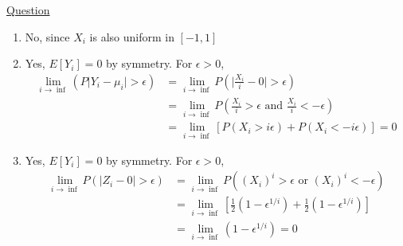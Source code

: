 \documentclass[11pt, a4paper]{article}
\begin{document}
\begin{enumerate}

        \hypertarget{a_convergence}{\item} \hyperlink{a_convergence}{Question}\newline
        \begin{enumerate}
            \item No, since $X_{i}$ is also uniform in $[-1,1]$
            \item Yes, $E[Y_{i}] = 0$ by symmetry. For $\epsilon > 0$,
            \begin{align*}
                \lim_{i \to \inf}(P\vert Y_{i} - \mu_{i} \vert > \epsilon) &= \lim_{i \to \inf} P(\vert \frac{X_{i}}{i} - 0 \vert > \epsilon)\\
                &= \lim_{i \to \inf} P(\frac{X_{i}}{i} > \epsilon \text{ and } \frac{X_{i}}{i} < -\epsilon)\\
                &= \lim_{i \to \inf} [P(X_{i} > i\epsilon) + P(X_{i} < -i\epsilon)] = 0
            \end{align*}
            \item Yes, $E[Y_{i}] = 0$ by symmetry. For $\epsilon > 0$,
            \begin{align*}
                \lim_{i \to \inf}P(\vert Z_{i} - 0 \vert > \epsilon) &= \lim_{i \to \inf}P((X_{i})^{i} > \epsilon \text{ or } (X_{i})^{i} < -\epsilon)\\
                &= \lim_{i \to \inf} [\frac{1}{2}(1 - \epsilon^{1/i}) + \frac{1}{2}(1 - \epsilon^{1/i})]\\
                &= \lim_{i \to \inf}(1 - \epsilon^{1/i}) = 0
            \end{align*}
        \end{enumerate}
    \end{enumerate}
\end{document}
